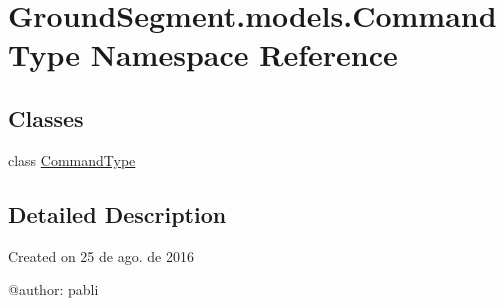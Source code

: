 \hypertarget{namespace_ground_segment_1_1models_1_1_command_type}{}\section{Ground\+Segment.\+models.\+Command\+Type Namespace Reference}
\label{namespace_ground_segment_1_1models_1_1_command_type}
\subsection*{Classes}
\begin{DoxyCompactItemize}
\item 
class \hyperlink{class_ground_segment_1_1models_1_1_command_type_1_1_command_type}{Command\+Type}
\end{DoxyCompactItemize}


\subsection{Detailed Description}
\begin{DoxyVerb}Created on 25 de ago. de 2016

@author: pabli
\end{DoxyVerb}
 